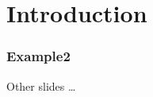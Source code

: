 \documentclass[../presentation.tex]{subfiles} %
\begin{document}
\section{Introduction} %

\begin{frame}

	\frametitle{Example2}

    Other slides \dots

\end{frame}
\end{document}
